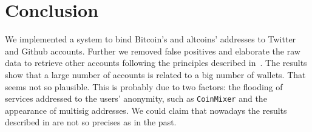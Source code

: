 \section{Conclusion} \label{conclusion}
We implemented a system to bind Bitcoin's and altcoins' addresses to Twitter
and Github accounts. Further we removed false positives and elaborate the raw
data to retrieve other accounts following the principles described
in~\cite{bib:fistful}.
The results show that a large number of accounts is related to a big number of
wallets. That seems not so plausible. This is probably due to two factors: the
flooding of services addressed to the users' anonymity, such as
\texttt{CoinMixer} and the appearance of multisig addresses. We could claim
that nowadays the results described in \cite{bib:fistful} are not so precises
as in the past.